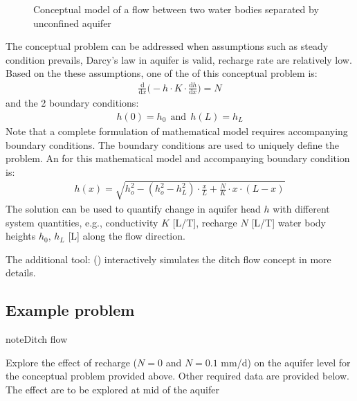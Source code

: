 \documentclass[letterpaper,10pt,english]{jupyterBook}
\begin{document}
\begin{figure}[htbp]
\centering
\capstart

\noindent{}
\caption{Conceptual model of a flow between two water bodies separated by unconfined aquifer}\label{\detokenize{content/modeling/31_intro_modeling:ditch}}\end{figure}

\sphinxAtStartPar
The conceptual problem can be addressed when assumptions such as steady condition prevails, Darcy’s law in aquifer is valid, recharge rate are relatively low. Based on the these assumptions, one of the  of this conceptual problem is:
\begin{equation*}
\begin{split}
\frac{\textrm{d}}{\textrm{d}x}\bigg(-h \cdot K\cdot \frac{\textrm{d}h}{\textrm{d}x}  \bigg) = N
\end{split}
\end{equation*}
\sphinxAtStartPar
and the 2 boundary conditions:
\begin{equation*}
\begin{split}
h(0) = h_0 \:\: \text{and} \:\: h(L) = h_L
\end{split}
\end{equation*}
\sphinxAtStartPar
Note that a complete formulation of mathematical model requires accompanying boundary conditions. The boundary conditions are used to uniquely define the problem. An  for this mathematical model and accompanying boundary condition is:
\begin{equation*}
\begin{split}
h(x) = \sqrt{h_o^2 - (h_o^2 - h_L^2)\cdot \frac{x}{L} + \frac{N}{K}\cdot x \cdot (L-x) }
\end{split}
\end{equation*}
\sphinxAtStartPar
The solution can be used to quantify change in aquifer head \(h\) with different system quantities, e.g., conductivity \(K\) {[}L/T{]}, recharge \(N\) {[}L/T{]} water body heights \(h_0,\, h_L\) {[}L{]} along the flow direction.

\sphinxAtStartPar
The additional tool:  () interactively simulates the ditch flow concept in more details.


\subsection{Example problem}
\label{\detokenize{content/modeling/31_intro_modeling:example-problem}}
\begin{sphinxadmonition}{note}{Ditch flow}

\sphinxAtStartPar
Explore the effect of recharge (\(N= 0\) and \(N= 0.1\) mm/d) on the aquifer level for the conceptual problem provided above. Other required data are provided below.
The effect are to be explored at mid of the aquifer
\end{sphinxadmonition}
\end{document}

